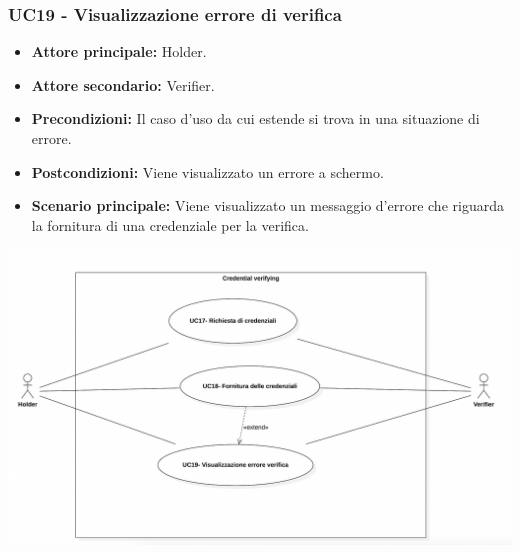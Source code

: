 \subsubsection{UC19 - Visualizzazione errore di verifica}
\begin{itemize}
    \item \textbf{Attore principale:} Holder.
    \item \textbf{Attore secondario:} Verifier.
    \item \textbf{Precondizioni:} Il caso d'uso da cui estende si trova in una situazione di errore.
    \item \textbf{Postcondizioni:} Viene visualizzato un errore a schermo. 
    \item \textbf{Scenario principale:} Viene visualizzato un messaggio d’errore che riguarda la fornitura di una credenziale per la verifica.
\end{itemize}

\begin{center}
    \includegraphics[scale = 0.5]{./res/img/UC4.PNG}
  \end{center}